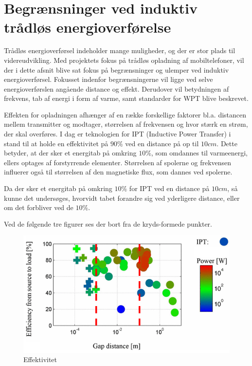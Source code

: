 \section{Begrænsninger ved induktiv trådløs energioverførelse }
Trådløs energioverførsel indeholder mange muligheder, og der er stor plads til videreudvikling. Med projektets fokus på trådløs opladning af mobiltelefoner, vil der i dette afsnit blive sat fokus på begrænsninger og ulemper ved induktiv energioverførsel. Fokusset indenfor begrænsningerne vil ligge ved selve energioverførslen angående distance og effekt. Derudover vil betydningen af frekvens, tab af energi i form af varme, samt standarder for WPT blive beskrevet.

Effekten for opladningen afhænger af en række forskellige faktorer bl.a. distancen mellem transmitter og modtager, størrelsen af frekvensen og hvor stærk en strøm, der skal overføres. I dag er teknologien for IPT (Inductive Power Transfer) i stand til at holde en effektivitet på $90\%$ ved en distance på op til $10cm$. Dette betyder, at der sker et energitab på omkring $10\%$, som omdannes til varmeenergi, ellers optages af forstyrrende elementer. Størrelsen af spolerne og frekvensen influerer også til størrelsen af den magnetiske flux, som dannes ved spolerne.

Da der sker et energitab på omkring $10\%$ for IPT ved en distance på $10cm$, så kunne det undersøges, hvorvidt tabet forandre sig ved yderligere distance, eller om det forbliver ved de $10\%$.

Ved de følgende tre figurer ses der bort fra de kryds-formede punkter.

\begin{figure}[H]
\centering
\includegraphics[scale=0.5]{Vildledning/Schematics/Effektivitet_vs_gap.png}
\caption{Effektivitet \cite{limit}}
\label{effektivitet}
\end{figure}

